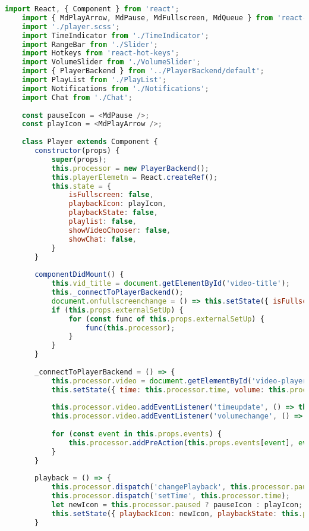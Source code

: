 \begin{lstlisting}[language=JavaScript,label={lst:player},caption={Компонент Player}]
    import React, { Component } from 'react';
    import { MdPlayArrow, MdPause, MdFullscreen, MdQueue } from 'react-icons/md';
    import './player.scss';
    import TimeIndicator from './TimeIndicator';
    import RangeBar from './Slider';
    import Hotkeys from 'react-hot-keys';
    import VolumeSlider from './VolumeSlider';
    import { PlayerBackend } from '../PlayerBackend/default';
    import PlayList from './PlayList';
    import Notifications from './Notifications';
    import Chat from './Chat';
     
    const pauseIcon = <MdPause />;
    const playIcon = <MdPlayArrow />;
     
    class Player extends Component {
       constructor(props) {
           super(props);
           this.processor = new PlayerBackend();
           this.playerElemetn = React.createRef();
           this.state = {
               isFullscreen: false,
               playbackIcon: playIcon,
               playbackState: false,
               playlist: false,
               showVideoChooser: false,
               showChat: false,
           }
       }
     
       componentDidMount() {
           this.vid_title = document.getElementById('video-title');
           this._connectToPlayerBackend();
           document.onfullscreenchange = () => this.setState({ isFullscreen: !this.state.isFullscreen });
           if (this.props.externalSetUp) {
               for (const func of this.props.externalSetUp) {
                   func(this.processor);
               }
           }
       }
     
       _connectToPlayerBackend = () => {
           this.processor.video = document.getElementById('video-player');
           this.setState({ time: this.processor.time, volume: this.processor.volume })
     
           this.processor.video.addEventListener('timeupdate', () => this.setState({ time: this.processor.time }));
           this.processor.video.addEventListener('volumechange', () => this.setState({ volume: this.processor.volume }));
     
           for (const event in this.props.events) {
               this.processor.addPreAction(this.props.events[event], event);
           }
       }
     
       playback = () => {
           this.processor.dispatch('changePlayback', this.processor.paused);
           this.processor.dispatch('setTime', this.processor.time);
           let newIcon = this.processor.paused ? pauseIcon : playIcon;
           this.setState({ playbackIcon: newIcon, playbackState: this.processor.paused });
       }
     

\end{lstlisting}
